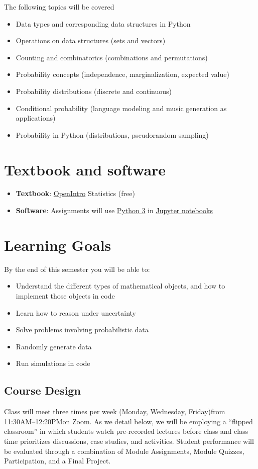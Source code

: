 \documentclass[10pt]{memoir}
\def\mymeetingdays{Monday, Wednesday, Friday}
\def\mymeetingtimes{11:30AM--12:20PM}
\begin{document}
The following topics will be covered

\begin{itemize}
\item Data types and corresponding data structures in Python
\item Operations on data structures (sets and vectors)
\item Counting and combinatorics (combinations and permutations)
\item Probability concepts (independence, marginalization, expected value)
\item Probability distributions (discrete and continuous)
\item Conditional probability (language modeling and music generation as applications)
\item Probability in Python (distributions, pseudorandom sampling)
\end{itemize}

\section{Textbook and software }

\begin{itemize}
\item \textbf{Textbook}: \href{https://www.abehandler.com/resources/openintro-statistics.pdf}{OpenIntro} Statistics (free)
\item \textbf{Software}: Assignments will use \href{https://www.python.org/}{Python 3} in \href{https://jupyter.org/}{Jupyter notebooks}
\end{itemize}


\section{Learning Goals}

By the end of this semester you will be able to:
\begin{itemize}
\item Understand the different types of mathematical objects, and how to implement those objects in code
\item Learn how to reason under uncertainty
\item Solve problems involving probabilistic data
\item Randomly generate data 
\item Run simulations in code
\end{itemize}

\subsection{Course Design}
Class will meet three times per week (\mymeetingdays)\space from \mymeetingtimes\space on Zoom. As we detail below, we will be employing a ``flipped classroom'' in which students watch pre-recorded lectures before class and class time prioritizes discussions, case studies, and activities. Student performance will be evaluated through a combination of Module Assignments, Module Quizzes, Participation, and a Final Project. 
\end{document}
